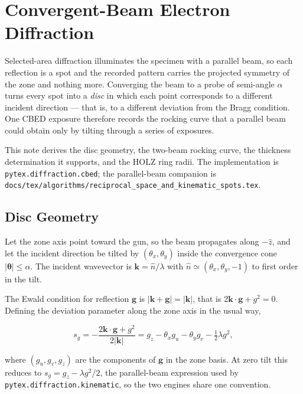 \section{Convergent-Beam Electron Diffraction}

Selected-area diffraction illuminates the specimen with a parallel beam, so each reflection
is a spot and the recorded pattern carries the projected symmetry of the zone and nothing
more. Converging the beam to a probe of semi-angle \(\alpha\) turns every spot into a
\emph{disc} in which each point corresponds to a different incident direction --- that is,
to a different deviation from the Bragg condition. One CBED exposure therefore records the
rocking curve that a parallel beam could obtain only by tilting through a series of
exposures.

This note derives the disc geometry, the two-beam rocking curve, the thickness
determination it supports, and the HOLZ ring radii. The implementation is
\texttt{pytex.diffraction.cbed}; the parallel-beam companion is
\texttt{docs/tex/algorithms/reciprocal\_space\_and\_kinematic\_spots.tex}.

\subsection{Disc Geometry}

Let the zone axis point toward the gun, so the beam propagates along \(-\hat{z}\), and let
the incident direction be tilted by \((\theta_x, \theta_y)\) inside the convergence cone
\(|\boldsymbol{\theta}| \le \alpha\). The incident wavevector is
\(\mathbf{k} = \hat{n}/\lambda\) with
\(\hat{n} \simeq (\theta_x, \theta_y, -1)\) to first order in the tilt.

The Ewald condition for reflection \(\mathbf{g}\) is
\(|\mathbf{k}+\mathbf{g}| = |\mathbf{k}|\), that is
\(2\mathbf{k}\cdot\mathbf{g} + g^{2} = 0\). Defining the deviation parameter along the zone
axis in the usual way,

\begin{equation}
  s_{g} = -\frac{2\mathbf{k}\cdot\mathbf{g} + g^{2}}{2|\mathbf{k}|}
        = g_{z} - \theta_x g_u - \theta_y g_v - \tfrac{1}{2}\lambda g^{2},
  \label{eq:cbed-s}
\end{equation}

where \((g_u, g_v, g_z)\) are the components of \(\mathbf{g}\) in the zone basis. At zero
tilt this reduces to \(s_g = g_z - \lambda g^{2}/2\), the parallel-beam expression used by
\texttt{pytex.diffraction.kinematic}, so the two engines share one convention.

